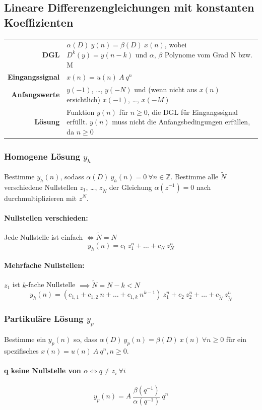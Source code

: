 \documentclass[10pt,a4paper]{article}
\begin{document}
\subsection*{Lineare Differenzengleichungen mit konstanten Koeffizienten}
\begin{tabular}{r p{12cm}}
	\textbf{DGL} & $\alpha(D) ~ y(n) = \beta(D) ~ x(n)$, wobei $D^k(y) = y(n-k)$ und $\alpha$, $\beta$ Polynome vom Grad N bzw. M \\
	\textbf{Eingangssignal} & $x(n) = u(n) ~ A ~ q^n$ \\
	\textbf{Anfangswerte} & $y(-1)$, …, $y(-N)$ und (wenn nicht aus $x(n)$ ersichtlich) $x(-1)$, …, $x(-M)$ \\
	\textbf{Lösung} & Funktion $y(n)$ für $n \geq 0$, die DGL für Eingangssignal erfüllt. $y(n)$ muss nicht die Anfangsbedingungen erfüllen, da $n \geq 0$
\end{tabular}

\subsubsection*{Homogene Lösung $y_h$}
Bestimme $y_h(n)$, sodass $\alpha(D) ~ y_h(n) = 0 ~ \forall n \in \mathbb Z$. Bestimme alle $\tilde N$ verschiedene Nullstellen $z_1$, …, $z_{\tilde N}$ der Gleichung $\alpha(z^{-1}) = 0$ nach durchmultiplizieren mit $z^N$.

\paragraph{Nullstellen verschieden:} Jede Nullstelle ist einfach $\Leftrightarrow \tilde N = N$
\[
	y_h(n) = c_1 ~ z_1^n + … + c_N ~ z_N^n
\]

\paragraph{Mehrfache Nullstellen:} $z_1$ ist $k$-fache Nullstelle $\implies \tilde N = N - k < N$
\[
	y_h(n) = \left(c_{1,1} + c_{1,2} ~ n + … + c_{1,k} ~ n^{k-1}\right) ~ z_1^n + c_2 ~ z_2^n + … + c_{\tilde N} ~ z_{\tilde N}^n
\]

\subsubsection*{Partikuläre Lösung $y_p$}
Bestimme ein $y_p(n)$ so, dass $\alpha(D) ~ y_p(n) = \beta(D) ~ x(n) ~ \forall n \geq 0$ für ein spezifisches $x(n) = u(n) ~ A ~ q^n, n \geq 0$.

\paragraph{q keine Nullstelle von $\alpha \Leftrightarrow q \neq z_i ~ \forall i$}
\[
	y_p(n) = A ~ \frac{\beta(q^{-1})}{\alpha(q^{-1})} ~ q^n
\]
\end{document}
